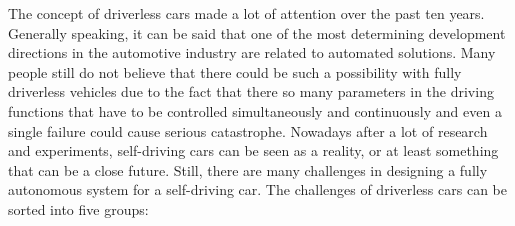 \documentclass[12pt,english,twoside]{article}
\begin{document}
The concept of driverless cars made a lot of attention over the past ten years. Generally speaking, it can be said that one of the most determining development directions in the automotive industry are related to automated solutions. Many people still do not believe that there could be such a possibility with fully driverless vehicles due to the fact that there so many parameters in the driving functions that have to be controlled simultaneously and continuously and even a single failure could cause serious catastrophe. Nowadays after a lot of research and experiments, self-driving cars can be seen as a reality, or at least something that can be a close future. Still, there are many challenges in designing a fully autonomous system for a self-driving car. The challenges of driverless cars can be sorted into five groups: \cite{5c}
\end{document}
